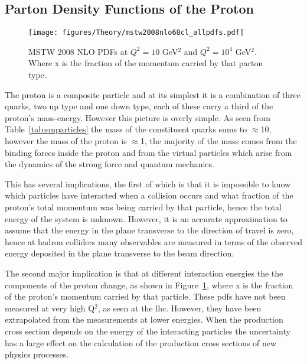 \subsection{Parton Density Functions of the Proton} %
\label{sub:parton_density_functions_of_the_proton}

\begin{figure}[htbp]
  \centering
    \texttt{[image: figures/Theory/mstw2008nlo68cl\_allpdfs.pdf]}
  \caption{MSTW 2008 NLO PDFs at $Q^{2} = 10$ GeV$^{2}$ and $Q^{2} = 10^{4}$ GeV$^{2}$. Where x is the fraction of the momentum carried by that parton type.}
  \label{fig:mstwpdfs}
\end{figure}

The proton is a composite particle and at its simplest it is a combination of 
three quarks, two up type and one down type, each of these carry a third of the 
proton's mass-energy. However this picture is overly simple. As seen from 
Table~\ref{tab:smparticles} the mass of the constituent quarks sums to 
$\approx$\unit{10}{\MeV}, however the mass of the proton is 
$\approx$\unit{1}{\GeV}, the majority of the mass comes from the binding forces 
inside the proton and from the virtual particles which arise from the dynamics 
of the strong force and quantum mechanics.

This has several implications, the first of which is that it is impossible to 
know which particles have interacted when a collision occurs and what fraction 
of the proton's total momentum was being carried by that particle, hence the 
total energy of the system is unknown. However, it is an accurate approximation 
to assume that the energy in the plane transverse to the direction of travel is 
zero, hence at hadron colliders many observables are measured in terms of the 
observed energy deposited in the plane transverse to the beam direction.


The second major implication is that at different interaction energies the the 
components of the proton change, as shown in Figure~\ref{fig:mstwpdfs}, where x 
is the fraction of the proton's momentum carried by that particle. These 
\ac{pdf}s have not been measured at very high Q$^{2}$, as seen at the 
\ac{lhc}. However, they have been extrapolated from the measurements at lower 
energies. When the production cross section depends on the energy of the 
interacting particles the uncertainty has a large effect on the calculation of 
the production cross sections of new physics processes.






